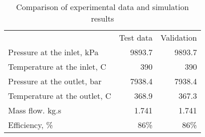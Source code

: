 \begin{table}
\caption{Comparison of experimental data and simulation results}
\begin{center}
\begin{tabulary}{0.9\textwidth}{LRR}
& Test data & Validation \\
Pressure at the inlet, kPa & 9893.7 & 9893.7 \\
Temperature at the inlet, C & 390 & 390 \\
Pressure at the outlet, bar & 7938.4 & 7938.4 \\
Temperature at the outlet, C & 368.9 & 367.3 \\
Mass flow. kg.s & 1.741 & 1.741 \\
Efficiency, \% & 86\% & 86\% \\
\end{tabulary}
\end{center}
\end{table}